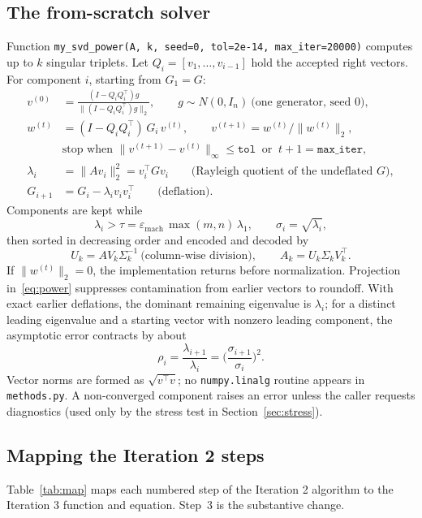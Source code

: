 \documentclass[11pt,letterpaper]{article}
\numberwithin{equation}{section}
\newcommand{\eps}{\varepsilon_{\mathrm{mach}}}
\newcommand{\fn}[1]{\texttt{#1}}
\begin{document}
\subsection{The from-scratch solver}
Function \fn{my\_svd\_power(A, k, seed=0, tol=2e-14, max\_iter=20000)} computes up to $k$ singular triplets. Let $Q_i=[v_1,\dots,v_{i-1}]$ hold the accepted right vectors. For component $i$, starting from $G_1=G$:
\begin{align}
v^{(0)}&=\frac{(I-Q_iQ_i^\top)g}{\|(I-Q_iQ_i^\top)g\|_2},\qquad g\sim N(0,I_n)\ \text{(one generator, seed 0)},\label{eq:start}\\
w^{(t)}&=(I-Q_iQ_i^\top)\,G_i\,v^{(t)},\qquad v^{(t+1)}=w^{(t)}/\|w^{(t)}\|_2,\label{eq:power}\\
&\text{stop when }\|v^{(t+1)}-v^{(t)}\|_\infty\le\texttt{tol}\ \text{ or }\ t+1=\texttt{max\_iter},\label{eq:stop}\\
\lambda_i&=\|Av_i\|_2^2=v_i^\top Gv_i\qquad\text{(Rayleigh quotient of the undeflated $G$)},\label{eq:rayleigh}\\
G_{i+1}&=G_i-\lambda_iv_iv_i^\top\qquad\text{(deflation)}.\label{eq:deflate}
\end{align}
Components are kept while
\begin{equation}\label{eq:cutoff}
\lambda_i>\tau=\eps\,\max(m,n)\,\lambda_1,\qquad \sigma_i=\sqrt{\lambda_i},
\end{equation}
then sorted in decreasing order and encoded and decoded by
\begin{equation}\label{eq:encode}
U_k=AV_k\Sigma_k^{-1}\ \text{(column-wise division)},\qquad A_k=U_k\Sigma_kV_k^\top .
\end{equation}
If $\|w^{(t)}\|_2=0$, the implementation returns before normalization. Projection in~\eqref{eq:power} suppresses contamination from earlier vectors to roundoff. With exact earlier deflations, the dominant remaining eigenvalue is $\lambda_i$; for a distinct leading eigenvalue and a starting vector with nonzero leading component, the asymptotic error contracts by about
\begin{equation}\label{eq:rate}
\rho_i=\frac{\lambda_{i+1}}{\lambda_i}=\Big(\frac{\sigma_{i+1}}{\sigma_i}\Big)^2 .
\end{equation}
Vector norms are formed as $\sqrt{v^\top v}$; no \fn{numpy.linalg} routine appears in \fn{methods.py}. A non-converged component raises an error unless the caller requests diagnostics (used only by the stress test in Section~\ref{sec:stress}).

\subsection{Mapping the Iteration 2 steps}
Table~\ref{tab:map} maps each numbered step of the Iteration 2 algorithm to the Iteration 3 function and equation. Step~3 is the substantive change.
\end{document}
